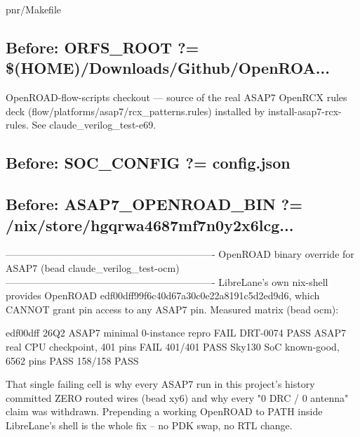 \begin{relocated}{pnr/Makefile}

\subsection*{Before: ORFS\_ROOT            ?= \$(HOME)/Downloads/Github/OpenROA...}

\begin{textblock}
OpenROAD-flow-scripts checkout — source of the real ASAP7 OpenRCX rules deck
(flow/platforms/asap7/rcx_patterns.rules) installed by install-asap7-rcx-rules.
See claude_verilog_test-e69.
\end{textblock}

\subsection*{Before: SOC\_CONFIG ?= config.json}


\subsection*{Before: ASAP7\_OPENROAD\_BIN  ?= /nix/store/hgqrwa4687mf7n0y2x6lcg...}

\begin{textblock}
----------------------------------------------------------------
OpenROAD binary override for ASAP7 (bead claude_verilog_test-ocm)
----------------------------------------------------------------
LibreLane's own nix-shell provides OpenROAD edf00dff99f6c40d67a30c0e22a8191c5d2ed9d6,
which CANNOT grant pin access to any ASAP7 pin. Measured matrix (bead ocm):

                                       edf00dff        26Q2
  ASAP7 minimal 0-instance repro       FAIL DRT-0074   PASS
  ASAP7 real CPU checkpoint, 401 pins  FAIL 401/401    PASS
  Sky130 SoC known-good, 6562 pins     PASS 158/158    PASS

That single failing cell is why every ASAP7 run in this project's history
committed ZERO routed wires (bead xy6) and why every "0 DRC / 0 antenna"
claim was withdrawn. Prepending a working OpenROAD to PATH inside LibreLane's
shell is the whole fix -- no PDK swap, no RTL change.


\end{textblock}
\end{relocated}
